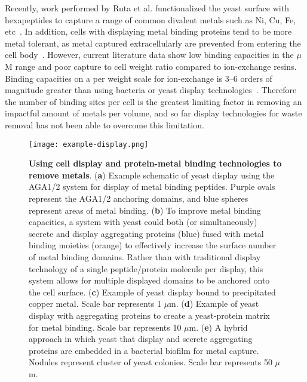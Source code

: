 \documentclass[../main/main]{subfiles}
\begin{document}
Recently, work performed by Ruta et al. functionalized the yeast surface with hexapeptides to capture a range of common divalent metals such as Ni, Cu, Fe, etc~\cite{ruta2017}. In addition, cells with displaying metal binding proteins tend to be more metal tolerant, as metal captured extracellularly are prevented from entering the cell body~\cite{ruta2017,kuroda2001cell}. However, current literature data show low binding capacities in the $\mu$M range and poor capture to cell weight ratio compared to ion-exchange resins. Binding capacities on a per weight scale for ion-exchange is 3--6 orders of magnitude greater than using bacteria or yeast display technologies~\cite{barakat2011new,stathi2010heavy}. Therefore the number of binding sites per cell is the greatest limiting factor in removing an impactful amount of metals per volume, and so far display technologies for waste removal has not been able to overcome this limitation.

\begin{figure}[H]
	\centering
	\texttt{[image: example-display.png]}
	\caption[Using cell display and protein-metal binding technologies to remove metals]
	{
		\textbf{Using cell display and protein-metal binding technologies to remove metals}.
    	(\textbf{a}) Example schematic of yeast display using the AGA1/2 system for display of metal binding peptides. Purple ovals represent the AGA1/2 anchoring domains, and blue spheres represent areas of metal binding.
    	(\textbf{b}) To improve metal binding capacities, a system with yeast could both (or simultaneously) secrete and display aggregating proteins (blue) fused with metal binding moieties (orange) to effectively increase the surface number of metal binding domains. Rather than with traditional display technology of a single peptide/protein molecule per display, this system allows for multiple displayed domains to be anchored onto the cell surface.
    	(\textbf{c}) Example of yeast display bound to precipitated copper metal. Scale bar represents 1 $\mu$m.
			(\textbf{d}) Example of yeast display with aggregating proteins to create a yeast-protein matrix for metal binding. Scale bar represents 10 $\mu$m.
			(\textbf{e}) A hybrid approach in which yeast that display and secrete aggregating proteins are embedded in a bacterial biofilm for metal capture\protect\footnotemark. Nodules represent cluster of yeast colonies. Scale bar represents 50 $\mu$m.
	}
	\label{figure:chapter1:example-biomineralization-bio}
\end{figure}
\end{document}
